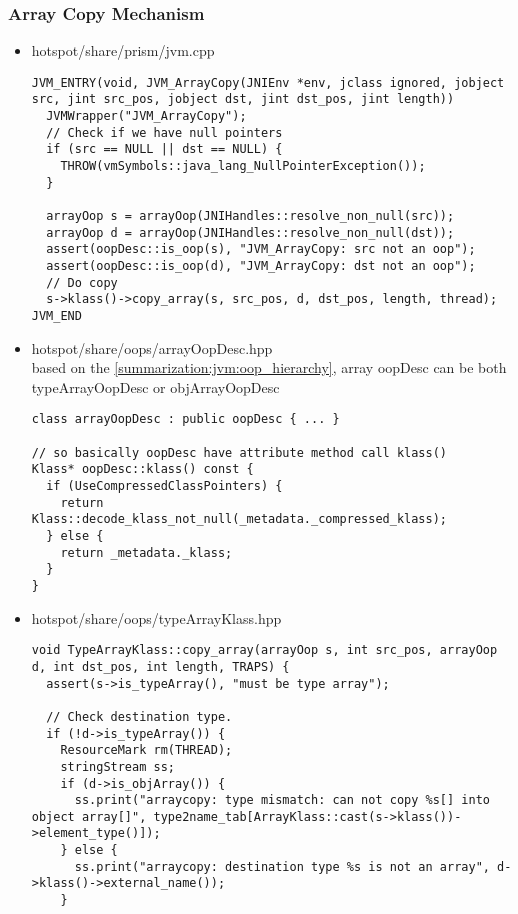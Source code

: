 \subsubsection{Array Copy Mechanism}
\label{summarization:jvm:array_copy_mechanism}

\begin{itemize}
  
\item hotspot/share/prism/jvm.cpp\\
\begin{verbatim}
JVM_ENTRY(void, JVM_ArrayCopy(JNIEnv *env, jclass ignored, jobject src, jint src_pos, jobject dst, jint dst_pos, jint length))
  JVMWrapper("JVM_ArrayCopy");
  // Check if we have null pointers
  if (src == NULL || dst == NULL) {
    THROW(vmSymbols::java_lang_NullPointerException());
  }

  arrayOop s = arrayOop(JNIHandles::resolve_non_null(src));
  arrayOop d = arrayOop(JNIHandles::resolve_non_null(dst));
  assert(oopDesc::is_oop(s), "JVM_ArrayCopy: src not an oop");
  assert(oopDesc::is_oop(d), "JVM_ArrayCopy: dst not an oop");
  // Do copy
  s->klass()->copy_array(s, src_pos, d, dst_pos, length, thread);
JVM_END
\end{verbatim}
  
\item hotspot/share/oops/arrayOopDesc.hpp\\ based on the \autoref{summarization:jvm:oop_hierarchy}, array oopDesc can be both typeArrayOopDesc or objArrayOopDesc \\
\begin{verbatim}
class arrayOopDesc : public oopDesc { ... }
  
// so basically oopDesc have attribute method call klass()
Klass* oopDesc::klass() const {
  if (UseCompressedClassPointers) {
    return Klass::decode_klass_not_null(_metadata._compressed_klass);
  } else {
    return _metadata._klass;
  }
}
\end{verbatim}

\item hotspot/share/oops/typeArrayKlass.hpp\\
\begin{verbatim}
void TypeArrayKlass::copy_array(arrayOop s, int src_pos, arrayOop d, int dst_pos, int length, TRAPS) {
  assert(s->is_typeArray(), "must be type array");

  // Check destination type.
  if (!d->is_typeArray()) {
    ResourceMark rm(THREAD);
    stringStream ss;
    if (d->is_objArray()) {
      ss.print("arraycopy: type mismatch: can not copy %s[] into object array[]", type2name_tab[ArrayKlass::cast(s->klass())->element_type()]);
    } else {
      ss.print("arraycopy: destination type %s is not an array", d->klass()->external_name());
    }
    

\end{verbatim}
\end{itemize}
